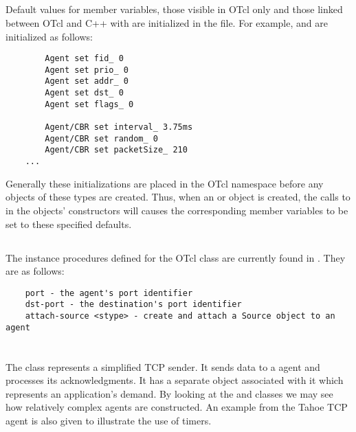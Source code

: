 \subsection{}

Default values for member variables, those visible in OTcl only and those
linked between OTcl and C++ with  are initialized
in the  file.  For example,
 and 
are initialized as follows:
\begin{small}
\begin{verbatim}
        Agent set fid_ 0
        Agent set prio_ 0
        Agent set addr_ 0
        Agent set dst_ 0
        Agent set flags_ 0

        Agent/CBR set interval_ 3.75ms
        Agent/CBR set random_ 0
        Agent/CBR set packetSize_ 210
	...
\end{verbatim}
\end{small}

Generally these initializations are placed in the OTcl namespace
before any objects of these types are created.
Thus, when an  or  object
is created, the calls to 
in the objects' constructors will causes the corresponding member variables
to be set to these specified defaults.

\subsection{}

The instance procedures defined for the OTcl  class are
currently found in .
They are as follows:
\begin{small}
\begin{verbatim}
	port - the agent's port identifier
	dst-port - the destination's port identifier
	attach-source <stype> - create and attach a Source object to an agent
\end{verbatim}
\end{small}

\section{}

The class  represents a simplified TCP sender.
It sends data to a  agent and processes its acknowledgments.
It has a separate object associated with it which represents
an application's demand.
By looking at the  and  classes
we may see how relatively complex agents are constructed.
An example from the Tahoe TCP agent  is also given
to illustrate the use of timers.


